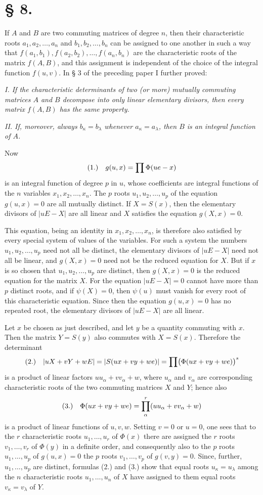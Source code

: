 \documentclass[11pt]{article}
\newcommand{\fnum}[1]{\textup{(\ensuremath{#1}.)}\quad}
\begin{document}
\section*{§ 8.}

If $A$ and $B$ are two commuting matrices of degree $n$, then their characteristic roots $a_1,a_2,\ldots,a_n$ and $b_1,b_2,\ldots,b_n$ can be assigned to one another in such a way that $f(a_1,b_1),f(a_2,b_2),\ldots,f(a_n,b_n)$ are the characteristic roots of the matrix $f(A,B)$, and this assignment is independent of the choice of the integral function $f(u,v)$. In § 3 of the preceding paper I further proved:

\emph{I. If the characteristic determinants of two (or more) mutually commuting matrices $A$ and $B$ decompose into only linear elementary divisors, then every matrix $f(A,B)$ has the same property.}

\emph{II. If, moreover, always $b_\kappa=b_\lambda$ whenever $a_\kappa=a_\lambda$, then $B$ is an integral function of $A$.}

Now
\[
\fnum{1} g(u,x)=\prod\Phi(ue-x)
\]
is an integral function of degree $p$ in $u$, whose coefficients are integral functions of the $n$ variables $x_1,x_2,\ldots,x_n$. The $p$ roots $u_1,u_2,\ldots,u_p$ of the equation $g(u,x)=0$ are all mutually distinct. If $X=S(x)$, then the elementary divisors of $|uE-X|$ are all linear and $X$ satisfies the equation $g(X,x)=0$.

This equation, being an identity in $x_1,x_2,\ldots,x_n$, is therefore also satisfied by every special system of values of the variables. For such a system the numbers $u_1,u_2,\ldots,u_p$ need not all be distinct, the elementary divisors of $|uE-X|$ need not all be linear, and $g(X,x)=0$ need not be the reduced equation for $X$. But if $x$ is so chosen that $u_1,u_2,\ldots,u_p$ are distinct, then $g(X,x)=0$ is the reduced equation for the matrix $X$. For the equation $|uE-X|=0$ cannot have more than $p$ distinct roots, and if $\psi(X)=0$, then $\psi(u)$ must vanish for every root of this characteristic equation. Since then the equation $g(u,x)=0$ has no repeated root, the elementary divisors of $|uE-X|$ are all linear.

Let $x$ be chosen as just described, and let $y$ be a quantity commuting with $x$. Then the matrix $Y=S(y)$ also commutes with $X=S(x)$. Therefore the determinant
\[
\fnum{2} |uX+vY+wE|=|S(ux+vy+we)|=\prod\bigl(\Phi(ux+vy+we)\bigr)^s
\]
is a product of linear factors $uu_\alpha+vv_\alpha+w$, where $u_\alpha$ and $v_\alpha$ are corresponding characteristic roots of the two commuting matrices $X$ and $Y$; hence also
\[
\fnum{3} \Phi(ux+vy+we)=\prod_\alpha^{r}(uu_\alpha+vv_\alpha+w)
\]
is a product of linear functions of $u,v,w$. Setting $v=0$ or $u=0$, one sees that to the $r$ characteristic roots $u_1,\ldots,u_r$ of $\Phi(x)$ there are assigned the $r$ roots $v_1,\ldots,v_r$ of $\Phi(y)$ in a definite order, and consequently also to the $p$ roots $u_1,\ldots,u_p$ of $g(u,x)=0$ the $p$ roots $v_1,\ldots,v_p$ of $g(v,y)=0$. Since, further, $u_1,\ldots,u_p$ are distinct, formulas (2.) and (3.) show that equal roots $u_\kappa=u_\lambda$ among the $n$ characteristic roots $u_1,\ldots,u_n$ of $X$ have assigned to them equal roots $v_\kappa=v_\lambda$ of $Y$.
\end{document}
